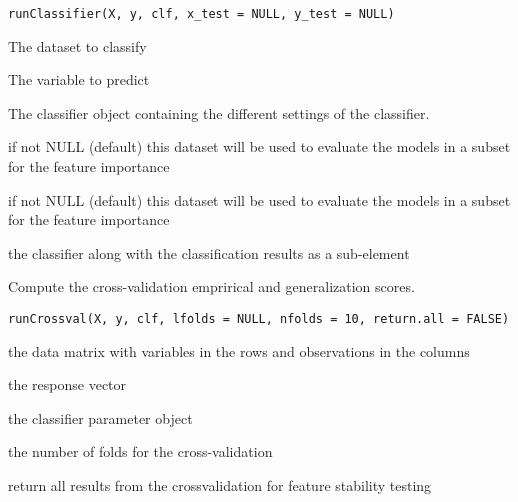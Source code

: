 \documentclass[a4paper]{book}
\begin{document}
%
\begin{Usage}
\begin{verbatim}
runClassifier(X, y, clf, x_test = NULL, y_test = NULL)
\end{verbatim}
\end{Usage}
%
\begin{Arguments}
\begin{ldescription}
\item[\code{X:}] The dataset to classify

\item[\code{y:}] The variable to predict

\item[\code{clf:}] The classifier object containing the different settings of the classifier.

\item[\code{x\_test:}] if not NULL (default) this dataset will be used to evaluate the models in a subset for the feature importance

\item[\code{y\_test:}] if not NULL (default) this dataset will be used to evaluate the models in a subset for the feature importance
\end{ldescription}
\end{Arguments}
%
\begin{Value}
the classifier along with the classification results as a sub-element
\end{Value}
%
\begin{Description}
Compute the cross-validation emprirical and generalization scores.
\end{Description}
%
\begin{Usage}
\begin{verbatim}
runCrossval(X, y, clf, lfolds = NULL, nfolds = 10, return.all = FALSE)
\end{verbatim}
\end{Usage}
%
\begin{Arguments}
\begin{ldescription}
\item[\code{X:}] the data matrix with variables in the rows and observations in the columns

\item[\code{y:}] the response vector

\item[\code{clf:}] the classifier parameter object

\item[\code{nfolds:}] the number of folds for the cross-validation

\item[\code{return.all:}] return all results from the crossvalidation for feature stability testing
\end{ldescription}
\end{Arguments}
\end{document}
